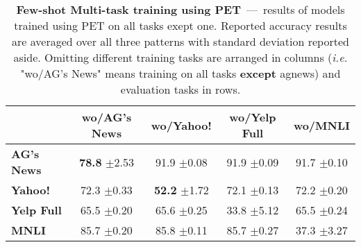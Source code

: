 \begin{table}[b]
	\fontsize{7}{10}
	\selectfont
	\begin{tabular*}{\columnwidth}{l@{\extracolsep{\fill}}cccc}
		\toprule
		& \textbf{wo/AG's News} & \textbf{wo/Yahoo!} & \textbf{wo/Yelp Full} & \textbf{wo/MNLI} \\
		\hline
		\textbf{AG's News}    & \textbf{78.8} \tiny$\pm$2.53        & 91.9 \tiny$\pm$0.08        & 91.9   \tiny$\pm$0.09          & 91.7 \tiny$\pm$0.10       \\
		\textbf{Yahoo!}     & 72.3 \tiny$\pm$0.33        & \textbf{52.2} \tiny$\pm$1.72        & 72.1   \tiny$\pm$0.13          & 72.2 \tiny$\pm$0.20       \\
		\textbf{Yelp Full} & 65.5 \tiny$\pm$0.20        & 65.6 \tiny$\pm$0.25        & 33.8   \tiny$\pm$5.12          & 65.5 \tiny$\pm$0.24       \\
		\textbf{MNLI}      & 85.7 \tiny$\pm$0.20        & 85.8 \tiny$\pm$0.11        & 85.7   \tiny$\pm$0.27          & 37.3 \tiny$\pm$3.27       \\
		\bottomrule
	\end{tabular*}
	\caption{\textbf{Few-shot Multi-task training using PET}~---~results of models trained using PET on all tasks exept one. Reported accuracy results are averaged over all three patterns with standard deviation reported aside. Omitting different training tasks are arranged in columns (\textit{i.e.} "wo/AG's News" means training on all tasks \textbf{except} agnews) and evaluation tasks in rows.}\label{tab:multi-use-logits-summary}
	\vspace{-4mm}
\end{table}
